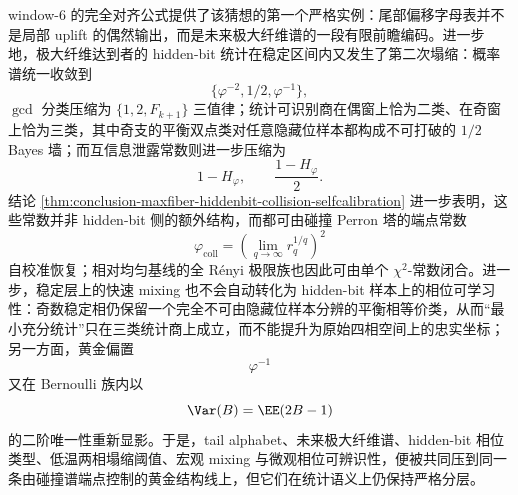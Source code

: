 \noindent
window-\(6\) 的完全对齐公式提供了该猜想的第一个严格实例：尾部偏移字母表并不是局部 uplift 的偶然输出，而是未来极大纤维谱的一段有限前瞻编码。进一步地，极大纤维达到者的 hidden-bit 统计在稳定区间内又发生了第二次塌缩：概率谱统一收敛到
\[
\{\varphi^{-2},1/2,\varphi^{-1}\},
\]
\(\gcd\) 分类压缩为 \(\{1,2,F_{k+1}\}\) 三值律；统计可识别商在偶窗上恰为二类、在奇窗上恰为三类，其中奇支的平衡双点类对任意隐藏位样本都构成不可打破的 \(1/2\) Bayes 墙；而互信息泄露常数则进一步压缩为
\[
1-H_\varphi,\qquad \frac{1-H_\varphi}{2}.
\]
结论 \ref{thm:conclusion-maxfiber-hiddenbit-collision-selfcalibration} 进一步表明，这些常数并非 hidden-bit 侧的额外结构，而都可由碰撞 Perron 塔的端点常数
\[
\varphi_{\mathrm{coll}}=\left(\lim_{q\to\infty}r_q^{1/q}\right)^2
\]
自校准恢复；相对均匀基线的全 Rényi 极限族也因此可由单个 \(\chi^2\)-常数闭合。进一步，稳定层上的快速 mixing 也不会自动转化为 hidden-bit 样本上的相位可学习性：奇数稳定相仍保留一个完全不可由隐藏位样本分辨的平衡相等价类，从而“最小充分统计”只在三类统计商上成立，而不能提升为原始四相空间上的忠实坐标；另一方面，黄金偏置
\[
\varphi^{-1}
\]
又在 Bernoulli 族内以
\[
\Var(B)=\EE(2B-1)
\]
的二阶唯一性重新显影。于是，tail alphabet、未来极大纤维谱、hidden-bit 相位类型、低温两相塌缩阈值、宏观 mixing 与微观相位可辨识性，便被共同压到同一条由碰撞谱端点控制的黄金结构线上，但它们在统计语义上仍保持严格分层。
